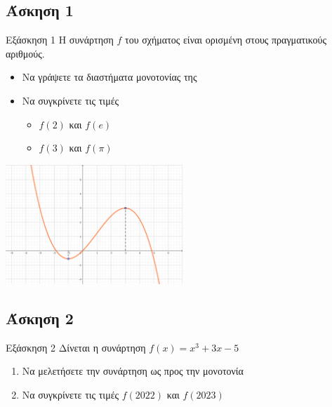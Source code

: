 \documentclass[greek]{beamer}
\begin{document}
\subsection{Άσκηση 1}
\begin{frame}[label=Άσκηση1,t]{Εξάσκηση 1}
      Η συνάρτηση $f$ του σχήματος είναι ορισμένη στους πραγματικούς αριθμούς.
      \begin{itemize}
            \item Να γράψετε τα διαστήματα μονοτονίας της
            \item Να συγκρίνετε τις τιμές
                  \begin{itemize}
                        \item $f(2)$ και $f(e)$
                        \item $f(3)$ και $f(\pi)$
                  \end{itemize}
      \end{itemize}
      \centering
      \includegraphics[width=0.5\textwidth]{"images/1.3 Μονοτονία.png"}
\end{frame}

\subsection{Άσκηση 2}
\begin{frame}[label=Άσκηση2,t]{Εξάσκηση 2}
      Δίνεται η συνάρτηση $f(x)=x^3+3x-5$
      \begin{enumerate}
            \item Να μελετήσετε την συνάρτηση ως προς την μονοτονία \pause
            \item Να συγκρίνετε τις τιμές $f(2022)$ και $f(2023)$
      \end{enumerate}
\end{frame}
\end{document}

